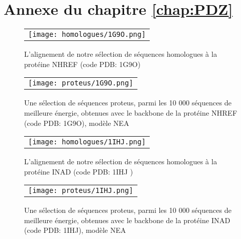 \chapter*{Annexe du chapitre \ref{chap:PDZ}}


\label{chap:annexePDZ}
   \begin{figure}[htbp]
     \centering
     \begin{tabular}{c}
       \texttt{[image: homologues/1G9O.png]} \\
     \end{tabular}
     \caption{L'alignement de notre sélection de séquences homologues à la protéine NHREF (code PDB: 1G9O)}
\label{align_homo:NHREF}
   \end{figure}

   \begin{figure}[!htbp]
     \centering
     \begin{tabular}{c}
       \texttt{[image: proteus/1G9O.png]} \\
     \end{tabular}
       \caption{Une sélection de séquences proteus, parmi les 10 000 séquences de meilleure énergie, obtenues avec le backbone de la protéine NHREF (code PDB: 1G9O), modèle NEA}
\label{align_proteus:NHREF}
   \end{figure}

\clearpage

   \begin{figure}[!htbp]
     \centering
     \begin{tabular}{c}
       \texttt{[image: homologues/1IHJ.png]} \\
     \end{tabular}
     \caption{L'alignement de notre sélection de séquences homologues à la protéine INAD (code PDB: 1IHJ )}
\label{align_homo:INAD}
   \end{figure}

   \begin{figure}[!htbp]
     \centering
     \begin{tabular}{c}
       \texttt{[image: proteus/1IHJ.png]} \\
     \end{tabular}
       \caption{Une sélection de séquences proteus, parmi les 10 000 séquences de meilleure énergie, obtenues avec le backbone de la protéine INAD (code PDB: 1IHJ), modèle NEA}
\label{align_proteus:INAD}
   \end{figure}
\clearpage

